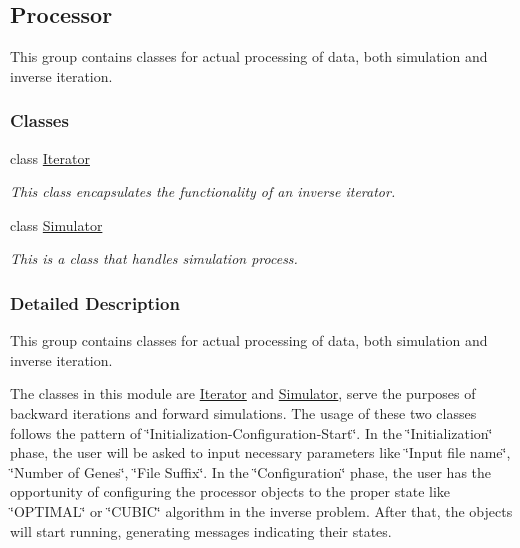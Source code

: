 \hypertarget{group___processor}{\subsection{Processor}
\label{group___processor}
}


This group contains classes for actual processing of data, both simulation and inverse iteration.  


\subsubsection*{Classes}
\begin{DoxyCompactItemize}
\item 
class \hyperlink{class_iterator}{Iterator}
\begin{DoxyCompactList}\small\item\em This class encapsulates the functionality of an inverse iterator. \end{DoxyCompactList}\item 
class \hyperlink{class_simulator}{Simulator}
\begin{DoxyCompactList}\small\item\em This is a class that handles simulation process. \end{DoxyCompactList}\end{DoxyCompactItemize}


\subsubsection{Detailed Description}
This group contains classes for actual processing of data, both simulation and inverse iteration. 

The classes in this module are \hyperlink{class_iterator}{Iterator} and \hyperlink{class_simulator}{Simulator}, serve the purposes of backward iterations and forward simulations. The usage of these two classes follows the pattern of \char`\"{}\+Initialization-\/\+Configuration-\/\+Start\char`\"{}. In the \char`\"{}\+Initialization\char`\"{} phase, the user will be asked to input necessary parameters like \char`\"{}\+Input file name\char`\"{}, \char`\"{}\+Number of Genes\char`\"{}, \char`\"{}\+File Suffix\char`\"{}. In the \char`\"{}\+Configuration\char`\"{} phase, the user has the opportunity of configuring the processor objects to the proper state like \char`\"{}\+O\+P\+T\+I\+M\+A\+L\char`\"{} or \char`\"{}\+C\+U\+B\+I\+C\char`\"{} algorithm in the inverse problem. After that, the objects will start running, generating messages indicating their states. 